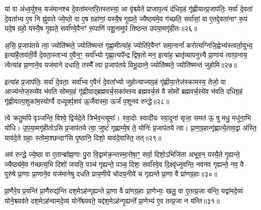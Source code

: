 {\anuvakamend[{ओष॑धीभ्य॒श्चतु॑र्दश च}]}%

यां वा अ॑ध्व॒र्युश्च॒ यज॑मानश्च दे॒वता॑मन्तरि॒तस्तस्या॒ आ वृ॑श्च्येते प्राजाप॒त्यं द॑धिग्र॒हं गृ॑ह्णीयात्प्र॒जाप॑तिः॒ सर्वा॑ दे॒वता॑ दे॒वता᳚भ्य ए॒व नि ह्नु॑वाते ज्ये॒ष्ठो वा ए॒ष ग्रहा॑णां॒ यस्यै॒ष गृ॒ह्यते॒ ज्यैष्ठ्य॑मे॒व ग॑च्छति॒ सर्वा॑सां॒ वा ए॒तद्दे॒वता॑नाꣳ रू॒पं यदे॒ष ग्रहो॒ यस्यै॒ष गृ॒ह्यते॒ सर्वा᳚ण्ये॒वैनꣳ॑ रू॒पाणि॑ पशू॒नामुप॑ तिष्ठन्त उपया॒मगृ॑हीतः॥२६॥

अ॒सि॒ प्र॒जाप॑तये त्वा॒ ज्योति॑ष्मते॒ ज्योति॑ष्मन्तं गृह्णा॒मीत्या॑ह॒ ज्योति॑रे॒वैनꣳ॑ समा॒नानां᳚ करोत्यग्निजि॒ह्वेभ्य॑स्त्वर्ता॒युभ्य॒ इत्या॑है॒ताव॑ती॒र्वै दे॒वता॒स्ताभ्य॑ ए॒वैन॒ꣳ॒ सर्वा᳚भ्यो गृह्णा॒त्यपे᳚न्द्र द्विष॒तो मन॒ इत्या॑ह॒ भ्रातृ॑व्यापनुत्त्यै प्रा॒णाय॑ त्वापा॒नाय॒ त्वेत्या॑ह प्रा॒णाने॒व यज॑माने दधाति॒ तस्मै᳚ त्वा प्र॒जाप॑तये विभू॒दाव्ने॒ ज्योति॑ष्मते॒ ज्योति॑ष्मन्तं जुहोमि॥२७॥

इत्या॑ह प्र॒जाप॑तिः॒ सर्वा॑ दे॒वताः॒ सर्वा᳚भ्य ए॒वैनं॑ दे॒वता᳚भ्यो जुहोत्याज्यग्र॒हं गृ॑ह्णीया॒त्तेज॑स्कामस्य॒ तेजो॒ वा आज्य॑न्तेज॒स्व्ये॑व भ॑वति सोमग्र॒हं गृ॑ह्णीयाद्ब्रह्मवर्च॒सका॑मस्य ब्रह्मवर्च॒सं वै सोमो᳚ ब्रह्मवर्च॒स्ये॑व भ॑वति दधिग्र॒हं गृ॑ह्णीयात्प॒शुका॑म॒स्योर्ग्वै दध्यूर्क्प॒शव॑ ऊ॒र्जैवास्मा॒ ऊर्जं॑ प॒शूनव॑ रुन्द्धे॥२८॥

{\anuvakamend[{उ॒प॒या॒मगृ॑हीतो जुहोमि॒ त्रिच॑त्वारिꣳशच्च}]}%

त्वे क्रतु॒मपि॑ वृञ्जन्ति॒ विश्वे॒ द्विर्यदे॒ते त्रिर्भव॒न्त्यूमाः᳚। स्वा॒दोः स्वादी॑यः स्वा॒दुना॑ सृजा॒ समत॑ ऊ॒ षु मधु॒ मधु॑ना॒भि यो॑धि। उ॒प॒या॒मगृ॑हीतो\-ऽसि प्र॒जाप॑तये त्वा॒ जुष्टं॑ गृह्णाम्ये॒ष ते॒ योनिः॑ प्र॒जाप॑तये त्वा। प्रा॒ण॒ग्र॒हान्गृ॑ह्णात्ये॒ताव॒द्वा अ॑स्ति॒ याव॑दे॒ते ग्रहाः॒ स्तोमा॒श्छन्दाꣳ॑सि पृ॒ष्ठानि॒ दिशो॒ याव॑दे॒वास्ति॒ तत्॥२९॥

अव॑ रुन्द्धे ज्ये॒ष्ठा वा ए॒तान्ब्रा᳚ह्म॒णाः पु॒रा वि॒द्वाम॑क्र॒न्तस्मा॒त्तेषा॒ꣳ॒ सर्वा॒ दिशो॒\-ऽभिजि॑ता अभूव॒न् यस्यै॒ते गृ॒ह्यन्ते॒ ज्यैष्ठ्य॑मे॒व ग॑च्छत्य॒भि दिशो॑ जयति॒ पञ्च॑ गृह्यन्ते॒ पञ्च॒ दिशः॒ सर्वा᳚स्वे॒व दि॒क्ष्वृ॑ध्नुवन्ति॒ नव॑नव गृह्यन्ते॒ नव॒ वै पुरु॑षे प्रा॒णाः प्रा॒णाने॒व यज॑मानेषु दधति प्राय॒णीये॑ चोदय॒नीये॑ च गृह्यन्ते प्रा॒णा वै प्रा॑णग्र॒हाः॥३०॥

प्रा॒णैरे॒व प्र॒यन्ति॑ प्रा॒णैरुद्य॑न्ति दश॒मे\-ऽह॑न्गृह्यन्ते प्रा॒णा वै प्रा॑णग्र॒हाः प्रा॒णेभ्यः॒ खलु॒ वा ए॒तत्प्र॒जा य॑न्ति॒ यद्वा॑मदे॒व्यं योने॒श्च्यव॑ते दश॒मे\-ऽह॑न्वामदे॒व्यं योने᳚श्च्यवते॒ यद्द॑श॒मे\-ऽह॑न्गृ॒ह्यन्ते᳚ प्रा॒णेभ्य॑ ए॒व तत्प्र॒जा न य॑न्ति॥३१॥

{\anuvakamend[{तत्प्रा॑णग्र॒हाः स॒प्तत्रिꣳ॑शच्च}]}%

